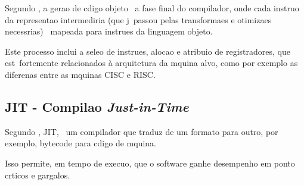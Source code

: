 Segundo \cite{Aho08}, a gera\ca o de c\oh digo objeto \eh\ a fase final do compilador, onde cada instru\ca o da representa\ca o intermedi\ah ria (que j\ah\ passou pelas transforma\co es e otimiza\co es necess\ah rias) \eh\ mapeada para instru\co es da linguagem objeto.

Este processo inclui a sele\ca o de instru\co es, aloca\ca o e atribui\ca o de registradores, que est\ao\ fortemente relacionados \`a arquitetura da m\ah quina alvo, como por exemplo as diferen\cc as entre as m\ah quinas CISC e RISC.



\subsection{JIT - Compila\ca o \emph{Just-in-Time}}

Segundo \cite{wiki:jit}, JIT, \eh\ um compilador que traduz de um formato para outro, por exemplo, bytecode para c\oh digo de m\ah quina.

Isso permite, em tempo de execu\ca o, que o software ganhe desempenho em ponto cr\ih ticos e gargalos.

